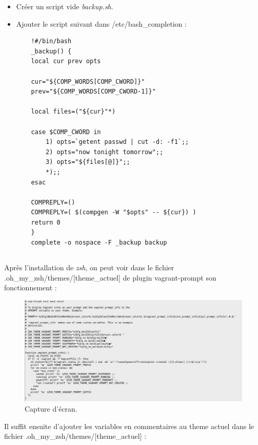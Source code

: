 \documentclass{article}
\begin{document}
\begin{itemize}
    \item Créer un script vide \emph{backup.sh}.
    \item Ajouter le script suivant dans /etc/bash\_completion :
    \begin{lstlisting}
    !#/bin/bash
    _backup() {
    local cur prev opts

    cur="${COMP_WORDS[COMP_CWORD]}"
    prev="${COMP_WORDS[COMP_CWORD-1]}"

    local files=("${cur}"*)

    case $COMP_CWORD in
        1) opts=`getent passwd | cut -d: -f1`;;
        2) opts="now tonight tomorrow";;
        3) opts="${files[@]}";;
        *);;
    esac

    COMPREPLY=()
    COMPREPLY=( $(compgen -W "$opts" -- ${cur}) )
    return 0
    }
    complete -o nospace -F _backup backup
    \end{lstlisting}
\end{itemize}

\subsection{}

Après l’installation de \emph{zsh}, on peut voir dans le fichier .oh\_my\_zsh/themes/[theme\_actuel] de plugin vagrant-prompt son fonctionnement :

\begin{figure}[h]
\centering
\includegraphics[width=\textwidth]{images/q1-7-1.jpg}
\caption{\label{fig:frog}Capture d'écran.}
\end{figure}

Il suffit ensuite d’ajouter les variables en commentaires au theme actuel dans le fichier \newline
.oh\_my\_zsh/themes/[theme\_actuel] :
\end{document}
